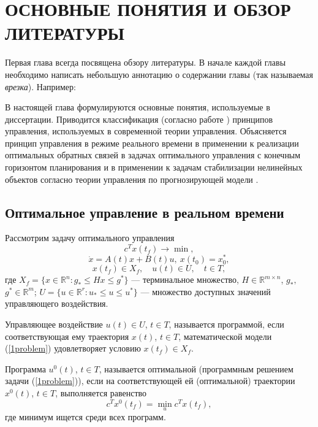 \chapter{ОСНОВНЫЕ ПОНЯТИЯ И ОБЗОР ЛИТЕРАТУРЫ}\label{chap1}

Первая глава всегда посвящена обзору литературы. В начале каждой главы необходимо написать небольшую аннотацию о содержании главы (так называемая \textit{врезка}). Например:

В настоящей глава формулируются основные понятия, используемые в диссертации. Приводится классификация (согласно работе \cite{GabasovKirillovaPU}) принципов управления, используемых в современной теории управления. Объясняется принцип управления в режиме реального времени в применении к реализации оптимальных обратных связей в задачах оптимального управления с конечным горизонтом планирования \cite{GabasovDmitrukKirillova15a} и в применении к задачам стабилизации нелинейных объектов согласно теории  управления по прогнозирующей модели \cite{Mayne}.


\section{Оптимальное управление в  реальном времени}\label{1sec:optimal-control}


Рассмотрим задачу оптимального управления
\begin{equation} \label{1problem}
    c^Tx(t_f)\to \min,
    \end{equation}
$$
    \dot{x}=A(t)x+B(t)u,\ x(t_0)=x_0^*,
    $$
$$
    x(t_f) \in X_f,\quad  u(t)\in U, \quad  t\in T,
    $$
где  $X_f=\{x\in \mathbb{R}^n: g_*\leq Hx \leq g^*\}$ --- терминальное
множество, $H\in \mathbb{R}^{m\times n}$, $g_*,$ $g^* \in \mathbb{R}^m$;
$U=\{u\in \mathbb{R}^r: u_*\le u\le u^*\}$ --- множество доступных значений
управляющего воздействия.

\begin{definition}  Управляющее воздействие $u(t)\in U$, $t\in T$, называется программой, если соответствующая ему
траектория $x(t)$, $t\in T$, математической модели (\ref{1problem}) удовлетворяет
условию $x(t_f)\in X_f$.
\end{definition}

\begin{definition}  Программа $u^0(t)$, $t\in T$,
называется оптимальной (программным решением задачи (\ref{1problem})), если на соответствующей ей (оптимальной) траектории $x^0(t)$, $t\in T$, выполняется равенство
$$
    c^Tx^0(t_f) = \min_u c^Tx(t_f),
     $$
где минимум ищется среди всех программ.
\end{definition}

